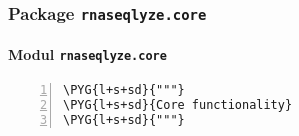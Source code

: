\subsubsection{Package \texttt{rnaseqlyze.core}}
\label{rnaseqlyze-pdf:package-rnaseqlyze-core}

\paragraph{Modul \texttt{rnaseqlyze.core}}
\label{rnaseqlyze-pdf:modul-rnaseqlyze-core}
\begin{Verbatim}[commandchars=\\\{\},numbers=left,firstnumber=1,stepnumber=5]
\PYG{l+s+sd}{"""}
\PYG{l+s+sd}{Core functionality}
\PYG{l+s+sd}{"""}
\end{Verbatim}


